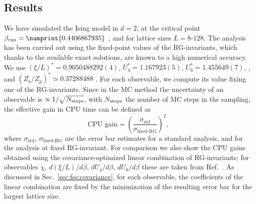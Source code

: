\documentclass[pre,twocolumn]{revtex4-2}
\begin{document}
\subsection{Results}
\label{sec:benchmarks:results}
We have simulated the Ising model in $d=2$, at the critical point $\beta_{\rm run}=\numprint{0.4406867935}$ \cite{baxter-book}, and for lattice sizes $L=8$-$128$.
The analysis has been carried out using the fixed-point values of the RG-invariants, which thanks to the available exact solutions, are known to a high numerical accuracy.
We use $(\xi/L)^*=0.9050488292(4)$, $U_4^*=1.167923(5)$, $U_6^*=1.455649(7)$, \cite{SS-00}, and $(Z_a/Z_p)^*\simeq 0.37288488$ \cite{CH-96}.
For each observable, we compute its value fixing one of the RG-invariants.
Since in the MC method the uncertainty of an observable is $\propto 1/\sqrt{N_{\rm steps}}$, with $N_{\rm steps}$ the number of MC steps in the sampling, the effective gain in CPU time can be defined as
\begin{equation}
  \text{CPU gain} = \left(\frac{\sigma_\text{std}}{\sigma_\text{fixed-RG}}\right)^2,
  \label{cpugain}
\end{equation}
where $\sigma_\text{std}$, $\sigma_\text{fixed-RG}$ are the error bar estimates for a standard analysis, and for the analysis at fixed RG-invariant.
For comparison we also show the CPU gains obtained using the covariance-optimized linear combination of RG-invariants; for observables $\chi$, $d(\xi / L)/d\beta$, $dU_4/d\beta$, $dU_6/d\beta$ these are taken from Ref.~\cite{PT-11}.
As discussed in Sec.~\ref{sec:fss:covariance}, for each observable, the coefficients of the linear combination are fixed by the minimization of the resulting error bar for the largest lattice size.
\end{document}
